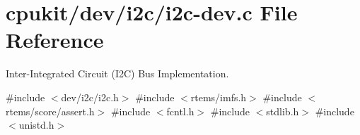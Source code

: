 \hypertarget{i2c-dev_8c}{}\section{cpukit/dev/i2c/i2c-\/dev.c File Reference}
\label{i2c-dev_8c}


Inter-\/\+Integrated Circuit (I2C) Bus Implementation.  


{\ttfamily \#include $<$dev/i2c/i2c.\+h$>$}\newline
{\ttfamily \#include $<$rtems/imfs.\+h$>$}\newline
{\ttfamily \#include $<$rtems/score/assert.\+h$>$}\newline
{\ttfamily \#include $<$fcntl.\+h$>$}\newline
{\ttfamily \#include $<$stdlib.\+h$>$}\newline
{\ttfamily \#include $<$unistd.\+h$>$}\newline
